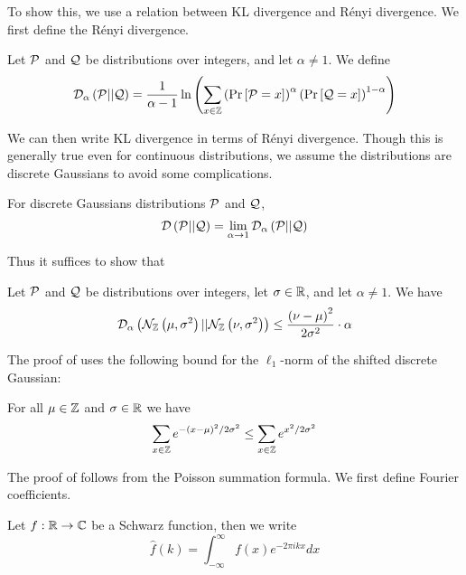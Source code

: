 \documentclass{article}
\begin{document}
To show this, we use a relation between KL divergence and R\'enyi divergence.
We first define the R\'enyi divergence.
\begin{definition}
	Let $\mathcal{P}$ and $\mathcal{Q}$ be distributions over integers, and let $\alpha\ne 1$.
	We define
	\begin{equation}
		\mathcal{D}_\alpha\left(\mathcal{P} || \mathcal{Q}\right) = \frac{1}{\alpha - 1}
		\ln\left(\sum_{x\in\mathbb{Z}}
		\left(\Pr\left[\mathcal{P}=x\right]\right)^\alpha
		\left(\Pr\left[\mathcal{Q}=x\right]\right)^{1-\alpha}\right)
	\end{equation}
\end{definition}

We can then write KL divergence in terms of R\'enyi divergence.
Though this is generally true even for continuous distributions,
we assume the distributions are discrete Gaussians to avoid some complications.
\begin{lemma}
	\label{lemma:KL-renyi}
	For discrete Gaussians distributions $\mathcal{P}$ and $\mathcal{Q}$,
	\begin{equation}
		\mathcal{D}\left(\mathcal{P} || \mathcal{Q}\right) = \lim_{\alpha\rightarrow 1}\mathcal{D}_\alpha\left(\mathcal{P} || \mathcal{Q}\right)
	\end{equation}
\end{lemma}

Thus it suffices to show that
\begin{lemma}
	\label{lemma:DG-renyi-bound}
	Let $\mathcal{P}$ and $\mathcal{Q}$ be distributions over integers, let $\sigma\in\mathbb{R}$, and let $\alpha\ne 1$. We have
	\begin{equation}
		\mathcal{D}_\alpha\left(\mathcal{N}_{\mathbb{Z}}\left(\mu, \sigma^2\right) || \mathcal{N}_{\mathbb{Z}}\left(\nu, \sigma^2\right)\right) \leq \frac{\left(\nu - \mu\right)^2}{2\sigma^2} \cdot \alpha
	\end{equation}
\end{lemma}

The proof of  uses the following bound for the $\ell_1$-norm of the shifted discrete Gaussian:
\begin{lemma}
	\label{lemma:norm-shifted-DG}
	For all $\mu\in\mathbb{Z}$ and $\sigma\in\mathbb{R}$ we have
	\begin{equation}
		\sum_{x\in\mathbb{Z}}e^{-\left(x-\mu\right)^2 / 2\sigma^2} \leq \sum_{x\in\mathbb{Z}}e^{x^2 / 2\sigma^2} 
	\end{equation}
\end{lemma}

The proof of  follows from the Poisson summation formula.
We first define Fourier coefficients.
\begin{definition}
	Let $f:\mathbb{R}\rightarrow\mathbb{C}$ be a Schwarz function, then we write
	\begin{equation}
		\hat{f}(k)=\int_{-\infty}^{\infty} f(x)e^{-2\pi i k x} dx
	\end{equation}
\end{definition}
\end{document}
